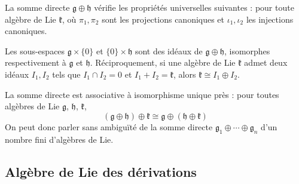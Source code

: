 \begin{proposition}
    La somme directe $\mathfrak{g} \oplus \mathfrak{h}$ vérifie les propriétés universelles suivantes : pour toute algèbre de Lie $\mathfrak{k}$,
    où $\pi_1, \pi_2$ sont les projections canoniques et $\iota_1, \iota_2$ les injections canoniques.
\end{proposition}

\omitted

\begin{corollary}
    Les sous-espaces $\mathfrak{g} \times \{0\}$ et $\{0\} \times \mathfrak{h}$ sont des idéaux de $\mathfrak{g} \oplus \mathfrak{h}$, isomorphes respectivement à $\mathfrak{g}$ et $\mathfrak{h}$. Réciproquement, si une algèbre de Lie $\mathfrak{k}$ admet deux idéaux $I_1, I_2$ tels que $I_1 \cap I_2 = 0$ et $I_1 + I_2 = \mathfrak{k}$, alors $\mathfrak{k} \cong I_1 \oplus I_2$.
\end{corollary}

\omitted

\begin{proposition}
    La somme directe est associative à isomorphisme unique près : pour toutes algèbres de Lie $\mathfrak{g}$, $\mathfrak{h}$, $\mathfrak{k}$,
    $$(\mathfrak{g} \oplus \mathfrak{h}) \oplus \mathfrak{k} \cong \mathfrak{g} \oplus (\mathfrak{h} \oplus \mathfrak{k})$$
    On peut donc parler sans ambiguïté de la somme directe $\mathfrak{g}_1 \oplus \cdots \oplus \mathfrak{g}_n$ d'un nombre fini d'algèbres de Lie.
\end{proposition}

\omitted

\subsection{Algèbre de Lie des dérivations}

